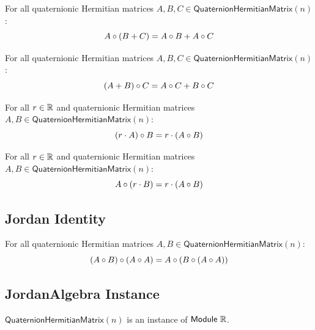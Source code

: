 \begin{theorem}
For all quaternionic Hermitian matrices $A, B, C \in \mathsf{QuaternionHermitianMatrix}(n)$:
\[ A \circ (B + C) = A \circ B + A \circ C \]
\end{theorem}

\begin{theorem}
For all quaternionic Hermitian matrices $A, B, C \in \mathsf{QuaternionHermitianMatrix}(n)$:
\[ (A + B) \circ C = A \circ C + B \circ C \]
\end{theorem}

\begin{theorem}
For all $r \in \mathbb{R}$ and quaternionic Hermitian matrices $A, B \in \mathsf{QuaternionHermitianMatrix}(n)$:
\[ (r \cdot A) \circ B = r \cdot (A \circ B) \]
\end{theorem}

\begin{theorem}
For all $r \in \mathbb{R}$ and quaternionic Hermitian matrices $A, B \in \mathsf{QuaternionHermitianMatrix}(n)$:
\[ A \circ (r \cdot B) = r \cdot (A \circ B) \]
\end{theorem}

\subsection{Jordan Identity}

\begin{theorem}
For all quaternionic Hermitian matrices $A, B \in \mathsf{QuaternionHermitianMatrix}(n)$:
\[ (A \circ B) \circ (A \circ A) = A \circ (B \circ (A \circ A)) \]
\end{theorem}

\subsection{JordanAlgebra Instance}

\begin{proposition}[moduleQuaternionHermitianMatrix]
$\mathsf{QuaternionHermitianMatrix}(n)$ is an instance of $\mathsf{Module}\ \R$.
\end{proposition}


